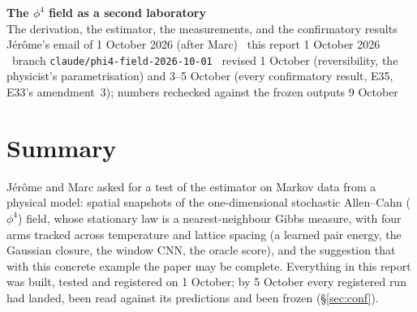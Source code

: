 \documentclass[10pt,a4paper]{article}
\newcommand{\code}[1]{\texttt{\small #1}}
\theoremstyle{plain}
\theoremstyle{remark}
\begin{document}
\begin{center}
{\Large\bfseries The $\phi^4$ field as a second laboratory}\\[0.25em]
{\normalsize The derivation, the estimator, the measurements, and the confirmatory results}\\[0.35em]
{\footnotesize Jérôme's email of 1 October 2026 (after Marc) \textperiodcentered\ this report 1 October 2026 \textperiodcentered\ branch
\code{claude/phi4-field-2026-10-01} \textperiodcentered\ revised 1 October (reversibility, the
physicist's parametrisation) and 3--5 October (every confirmatory result, E35, E33's amendment~3);
numbers rechecked against the frozen outputs 9 October}
\end{center}

\vspace{-0.4em}

\section*{Summary}

Jérôme and Marc asked for a test of the estimator on Markov data from a physical model: spatial
snapshots of the one-dimensional stochastic Allen--Cahn ($\phi^4$) field, whose stationary law is a
nearest-neighbour Gibbs measure, with four arms tracked across temperature and lattice spacing (a
learned pair energy, the Gaussian closure, the window CNN, the oracle score), and the suggestion that
with this concrete example the paper may be complete. Everything in this report was built, tested
and registered on 1 October; by 5 October every registered run had landed, been read against its
predictions and been frozen (\S\ref{sec:conf}).
\end{document}
